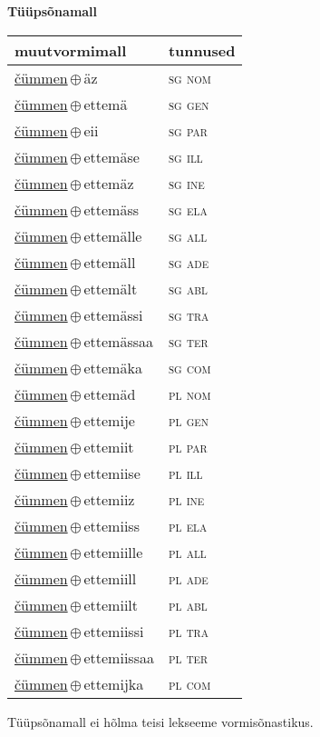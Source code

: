 

\vspace{3.5em}
\noindent \begin{minipage}{\textwidth}
\noindent \textbf{Tüüpsõnamall \,}\\

\begin{sideways}
\begin{tabular}{l l}
muutvormimall & tunnused \\
\hline
\underline{čümmen}\,$\oplus$\,äz & \textsc{ sg nom } \\
\underline{čümmen}\,$\oplus$\,ettemä & \textsc{ sg gen } \\
\underline{čümmen}\,$\oplus$\,eii & \textsc{ sg par } \\
\underline{čümmen}\,$\oplus$\,ettemäse & \textsc{ sg ill } \\
\underline{čümmen}\,$\oplus$\,ettemäz & \textsc{ sg ine } \\
\underline{čümmen}\,$\oplus$\,ettemäss & \textsc{ sg ela } \\
\underline{čümmen}\,$\oplus$\,ettemälle & \textsc{ sg all } \\
\underline{čümmen}\,$\oplus$\,ettemäll & \textsc{ sg ade } \\
\underline{čümmen}\,$\oplus$\,ettemält & \textsc{ sg abl } \\
\underline{čümmen}\,$\oplus$\,ettemässi & \textsc{ sg tra } \\
\underline{čümmen}\,$\oplus$\,ettemässaa & \textsc{ sg ter } \\
\underline{čümmen}\,$\oplus$\,ettemäka & \textsc{ sg com } \\
\underline{čümmen}\,$\oplus$\,ettemäd & \textsc{ pl nom } \\
\underline{čümmen}\,$\oplus$\,ettemije & \textsc{ pl gen } \\
\underline{čümmen}\,$\oplus$\,ettemiit & \textsc{ pl par } \\
\underline{čümmen}\,$\oplus$\,ettemiise & \textsc{ pl ill } \\
\underline{čümmen}\,$\oplus$\,ettemiiz & \textsc{ pl ine } \\
\underline{čümmen}\,$\oplus$\,ettemiiss & \textsc{ pl ela } \\
\underline{čümmen}\,$\oplus$\,ettemiille & \textsc{ pl all } \\
\underline{čümmen}\,$\oplus$\,ettemiill & \textsc{ pl ade } \\
\underline{čümmen}\,$\oplus$\,ettemiilt & \textsc{ pl abl } \\
\underline{čümmen}\,$\oplus$\,ettemiissi & \textsc{ pl tra } \\
\underline{čümmen}\,$\oplus$\,ettemiissaa & \textsc{ pl ter } \\
\underline{čümmen}\,$\oplus$\,ettemijka & \textsc{ pl com } \\
\end{tabular}
\end{sideways}
\label{tab:tüüpsõnamall-čümmenäz}

\end{minipage}

 
\vspace{1em}
\noindent Tüüpsõnamall  ei hõlma teisi lekseeme vormi\-sõnastikus.
